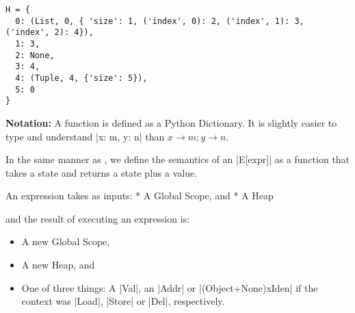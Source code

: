 \begin{verbatim}
H = {
  0: (List, 0, { 'size': 1, ('index', 0): 2, ('index', 1): 3, ('index', 2): 4}),
  1: 3,
  2: None,
  3: 4,
  4: (Tuple, 4, {'size': 5}),
  5: 0
}
\end{verbatim}

\textbf{Notation:} A function is defined as a Python Dictionary. It is
slightly easier to type and understand \pycode|{x: m, y: n}| than
\(x \rightarrow m; y \rightarrow n\).

{}

In the same manner as \textcite{fromherz_static_2018}, we define the
semantics of an \pycode|E[expr]| as a function that
takes a state and returns a state plus a value.

An expression takes as inputs: * A Global Scope, and * A Heap

and the result of executing an expression is:

\begin{itemize}
\tightlist
\item
  A new Global Scope,
\item
  A new Heap, and
\item
  One of three things: A \pycode|Val|, an \pycode|Addr| or
  \pycode|(Object+None)xIden| if the context was \pycode|Load|,
  \pycode|Store| or \pycode|Del|, respectively.
\end{itemize}

{}

